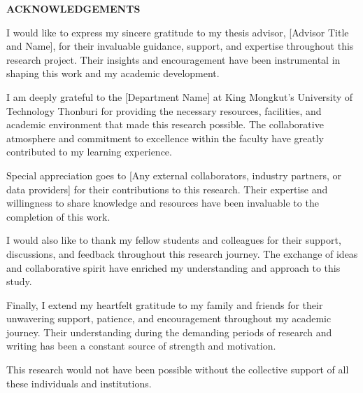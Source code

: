 \newpage
\thispagestyle{plain}

\begin{center}
\fontsize{15}{22.5}\selectfont\bfseries
ACKNOWLEDGEMENTS
\end{center}

\vspace{36pt}

\fontsize{12}{18}\selectfont
I would like to express my sincere gratitude to my thesis advisor, [Advisor Title and Name], for their invaluable guidance, support, and expertise throughout this research project. Their insights and encouragement have been instrumental in shaping this work and my academic development.

I am deeply grateful to the [Department Name] at King Mongkut's University of Technology Thonburi for providing the necessary resources, facilities, and academic environment that made this research possible. The collaborative atmosphere and commitment to excellence within the faculty have greatly contributed to my learning experience.

Special appreciation goes to [Any external collaborators, industry partners, or data providers] for their contributions to this research. Their expertise and willingness to share knowledge and resources have been invaluable to the completion of this work.

I would also like to thank my fellow students and colleagues for their support, discussions, and feedback throughout this research journey. The exchange of ideas and collaborative spirit have enriched my understanding and approach to this study.

Finally, I extend my heartfelt gratitude to my family and friends for their unwavering support, patience, and encouragement throughout my academic journey. Their understanding during the demanding periods of research and writing has been a constant source of strength and motivation.

This research would not have been possible without the collective support of all these individuals and institutions.